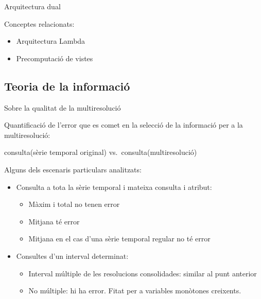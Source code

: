 \begin{frame}{Arquitectura dual}

Conceptes relacionats: 
\begin{itemize}
\item Arquitectura Lambda \parencite{marz14:bigdata} 
\item Precomputació de vistes \parencite{date04:introduction8}
\end{itemize}





\end{frame}




\subsection*{Teoria de la informació}
\begin{frame}{Sobre la qualitat de la multiresolució}

  Quantificació de l'error que es comet en la selecció de la informació
  per a la multiresolució:

\begin{center}
consulta(sèrie temporal original) vs.\ consulta(multiresolució)
\end{center}


Alguns dels escenaris particulars analitzats:
\begin{itemize}
\item Consulta a tota la sèrie temporal i mateixa consulta i atribut:
  \begin{itemize}
  \item Màxim i total no tenen error
  \item Mitjana té error
  \item Mitjana en el cas d'una sèrie temporal regular no té error 
  \end{itemize}

\item Consultes d'un interval determinat:
  \begin{itemize}
  \item Interval múltiple de les resolucions consolidades: similar al punt anterior
  \item No múltiple: hi ha error. Fitat per a variables monòtones creixents.
  \end{itemize}



\end{itemize}

\end{frame}




